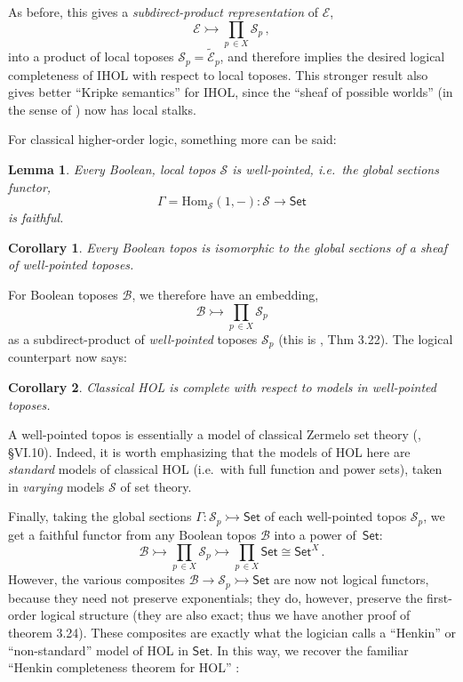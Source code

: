 \documentclass[12pt]{article}
\newcommand{\E}{\ensuremath{\mathcal{E}}}
\newcommand{\Set}{\ensuremath{\mathsf{Set}}}
\renewcommand{\hom}{\ensuremath{\mathrm{Hom}}}
\newtheorem*{lemma*}{Lemma}
\newtheorem*{corollary*}{Corollary}
\theoremstyle{remark}
\theoremstyle{definition}
\begin{document}
As before, this gives a \emph{subdirect-product representation} of $\E$,
\[
\E \rightarrowtail \prod_{p\,\in X}\mathcal{S}_p\,,
\]
into a product of local toposes $\mathcal{S}_p = \widetilde{\E}_p$, and therefore implies the desired logical completeness of IHOL with respect to local toposes.  
This stronger result also gives better ``Kripke semantics'' for IHOL, since the ``sheaf of possible worlds'' (in the sense of \cite{L1}) now has local stalks.
\medskip

For classical higher-order logic, something more can be said:

\begin{lemma*}
Every Boolean, local topos $\mathcal{S}$ is well-pointed, i.e.\ the global sections functor,
\[
\Gamma = \hom_\mathcal{S}(1, - ) : \mathcal{S} \to \Set
\]
is faithful.
\end{lemma*}

\begin{corollary*}
Every Boolean topos is isomorphic to the global sections of a sheaf of well-pointed toposes.  
\end{corollary*}
%
For Boolean toposes $\mathcal{B}$, we therefore have an embedding, 
\[
\mathcal{B} \rightarrowtail \prod_{p\,\in X}\mathcal{S}_p 
\]
as a subdirect-product of \emph{well-pointed} toposes $\mathcal{S}_p$ (this is \cite{F}, Thm 3.22).  The logical counterpart now says:
%
\begin{corollary*}
Classical HOL is complete with respect to models in well-pointed toposes.
\end{corollary*}
%
A well-pointed topos is essentially a model of classical Zermelo set theory (\cite{MM}, {\S}VI.10).  Indeed, it is worth emphasizing that the models of HOL here are \emph{standard} models of classical HOL (i.e.\ with full function and power sets), taken in \emph{varying} models $\mathcal{S}$ of set theory.

Finally, taking the global sections $\Gamma:\mathcal{S}_p \rightarrowtail \Set$ of each well-pointed topos $\mathcal{S}_p$, we get a faithful functor from any Boolean topos $\mathcal{B}$ into a power of~$\Set$:
\[
\mathcal{B} \rightarrowtail \prod_{p\,\in X}\mathcal{S}_p \rightarrowtail \prod_{p\,\in X}\Set \cong \Set^X\,.
\]
However, the various composites $\mathcal{B} \rightarrow \mathcal{S}_p \rightarrowtail \Set$ are now not logical functors, because they need not preserve exponentials; they do, however, preserve the first-order logical structure (they are also exact; thus we have another proof of \cite{F} theorem 3.24).  These composites are exactly what the logician calls a ``Henkin'' or ``non-standard'' model of HOL in $\Set$.  In this way, we recover the familiar ``Henkin completeness theorem for HOL'' \cite{H}:
\end{document}
